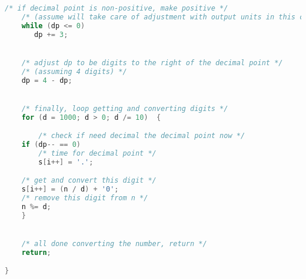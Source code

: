 \begin{lstlisting}[language=C]
    /* if decimal point is non-positive, make positive */
    /* (assume will take care of adjustment with output units in this case) */
    while (dp <= 0)
       dp += 3;


    /* adjust dp to be digits to the right of the decimal point */
    /* (assuming 4 digits) */
    dp = 4 - dp;


    /* finally, loop getting and converting digits */
    for (d = 1000; d > 0; d /= 10)  {

        /* check if need decimal the decimal point now */
	if (dp-- == 0)
	    /* time for decimal point */
	    s[i++] = '.';

	/* get and convert this digit */
	s[i++] = (n / d) + '0';
	/* remove this digit from n */
	n %= d;
    }


    /* all done converting the number, return */
    return;

}
\end{lstlisting}